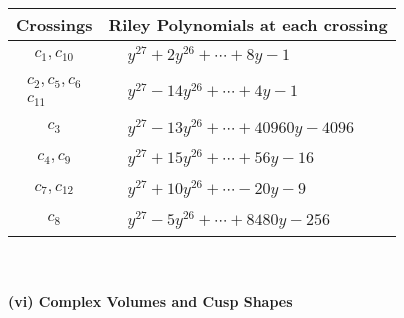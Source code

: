 \documentclass[1p]{elsarticle_modified}
\theoremstyle{definition}
\begin{document}
\begin{tabular}{m{50pt}|m{274pt}}
Crossings & \hspace{64pt}Riley Polynomials at each crossing \\
\hline $$\begin{aligned}c_{1},c_{10}\end{aligned}$$&$\begin{aligned}
&y^{27}+2 y^{26}+\cdots+8 y-1
\end{aligned}$\\
\hline $$\begin{aligned}c_{2},c_{5},c_{6}\\c_{11}\end{aligned}$$&$\begin{aligned}
&y^{27}-14 y^{26}+\cdots+4 y-1
\end{aligned}$\\
\hline $$\begin{aligned}c_{3}\end{aligned}$$&$\begin{aligned}
&y^{27}-13 y^{26}+\cdots+40960 y-4096
\end{aligned}$\\
\hline $$\begin{aligned}c_{4},c_{9}\end{aligned}$$&$\begin{aligned}
&y^{27}+15 y^{26}+\cdots+56 y-16
\end{aligned}$\\
\hline $$\begin{aligned}c_{7},c_{12}\end{aligned}$$&$\begin{aligned}
&y^{27}+10 y^{26}+\cdots-20 y-9
\end{aligned}$\\
\hline $$\begin{aligned}c_{8}\end{aligned}$$&$\begin{aligned}
&y^{27}-5 y^{26}+\cdots+8480 y-256
\end{aligned}$\\
\hline
\end{tabular}\\~\\
\newpage\flushleft \textbf{(vi) Complex Volumes and Cusp Shapes}
\end{document}
